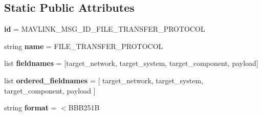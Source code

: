 \subsection*{Static Public Attributes}
\begin{DoxyCompactItemize}
\item 
\mbox{\label{classpymavlink_1_1dialects_1_1v10_1_1MAVLink__file__transfer__protocol__message_ae9807b237caf726c4c38f0dc4a5e2567}} 
{\bfseries id} = M\+A\+V\+L\+I\+N\+K\+\_\+\+M\+S\+G\+\_\+\+I\+D\+\_\+\+F\+I\+L\+E\+\_\+\+T\+R\+A\+N\+S\+F\+E\+R\+\_\+\+P\+R\+O\+T\+O\+C\+OL
\item 
\mbox{\label{classpymavlink_1_1dialects_1_1v10_1_1MAVLink__file__transfer__protocol__message_a80a8ca4c2681515f6e79ba63b1975757}} 
string {\bfseries name} = \textquotesingle{}F\+I\+L\+E\+\_\+\+T\+R\+A\+N\+S\+F\+E\+R\+\_\+\+P\+R\+O\+T\+O\+C\+OL\textquotesingle{}
\item 
\mbox{\label{classpymavlink_1_1dialects_1_1v10_1_1MAVLink__file__transfer__protocol__message_aeb725b7c1527cc9ba1a6a70c9e6fc7e4}} 
list {\bfseries fieldnames} = \mbox{[}\textquotesingle{}target\+\_\+network\textquotesingle{}, \textquotesingle{}target\+\_\+system\textquotesingle{}, \textquotesingle{}target\+\_\+component\textquotesingle{}, \textquotesingle{}payload\textquotesingle{}\mbox{]}
\item 
\mbox{\label{classpymavlink_1_1dialects_1_1v10_1_1MAVLink__file__transfer__protocol__message_add528c9af5e1040145d0e1a519beea23}} 
list {\bfseries ordered\+\_\+fieldnames} = \mbox{[} \textquotesingle{}target\+\_\+network\textquotesingle{}, \textquotesingle{}target\+\_\+system\textquotesingle{}, \textquotesingle{}target\+\_\+component\textquotesingle{}, \textquotesingle{}payload\textquotesingle{} \mbox{]}
\item 
\mbox{\label{classpymavlink_1_1dialects_1_1v10_1_1MAVLink__file__transfer__protocol__message_a501b8608e60efb7b18516e8444817754}} 
string {\bfseries format} = \textquotesingle{}$<$B\+B\+B251B\textquotesingle{}

\end{DoxyCompactItemize}
